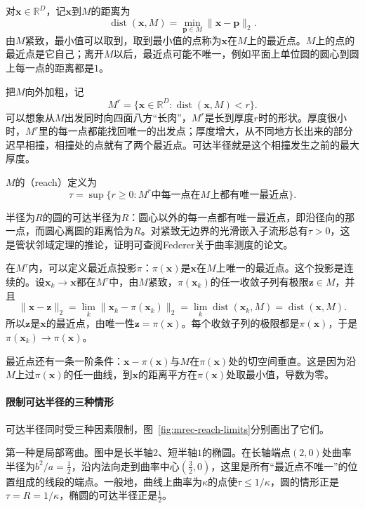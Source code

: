 对$\bm x\in\mathbb R^D$，记$\bm x$到$M$的距离为
\[
 \operatorname{dist}(\bm x,M)=\min_{\bm p\in M}\lVert\bm x-\bm p\rVert_2 .
\]
由$M$紧致，最小值可以取到，取到最小值的点称为$\bm x$在$M$上的最近点。$M$上的点的最近点是它自己；离开$M$以后，最近点可能不唯一，例如平面上单位圆的圆心到圆上每一点的距离都是$1$。

把$M$向外加粗，记
\[
 M^r=\{\bm x\in\mathbb R^D:\operatorname{dist}(\bm x,M)<r\}.
\]
可以想象从$M$出发同时向四面八方“长肉”，$M^r$是长到厚度$r$时的形状。厚度很小时，$M^r$里的每一点都能找回唯一的出发点；厚度增大，从不同地方长出来的部分迟早相撞，相撞处的点就有了两个最近点。可达半径就是这个相撞发生之前的最大厚度。

\begin{definition}[可达半径]
\label{def:mrec-reach}
$M$的（reach）定义为
\begin{equation}
 \tau=\sup\{r\geq0:M^r\text{中每一点在}M\text{上都有唯一最近点}\}.
 \label{eq:mrec-reach}
\end{equation}
\end{definition}

半径为$R$的圆的可达半径为$R$：圆心以外的每一点都有唯一最近点，即沿径向的那一点，而圆心离圆的距离恰为$R$。对紧致无边界的光滑嵌入子流形总有$\tau>0$，这是管状邻域定理的推论，证明可查阅Federer关于曲率测度的论文。

在$M^\tau$内，可以定义最近点投影$\pi$：$\pi(\bm x)$是$\bm x$在$M$上唯一的最近点。这个投影是连续的。设$\bm x_k\to\bm x$都在$M^\tau$中，由$M$紧致，$\pi(\bm x_k)$的任一收敛子列有极限$\bm z\in M$，并且
\[
 \lVert\bm x-\bm z\rVert_2=\lim_k\lVert\bm x_k-\pi(\bm x_k)\rVert_2=\lim_k\operatorname{dist}(\bm x_k,M)=\operatorname{dist}(\bm x,M).
\]
所以$\bm z$是$\bm x$的最近点，由唯一性$\bm z=\pi(\bm x)$。每个收敛子列的极限都是$\pi(\bm x)$，于是$\pi(\bm x_k)\to\pi(\bm x)$。

最近点还有一条一阶条件：$\bm x-\pi(\bm x)$与$M$在$\pi(\bm x)$处的切空间垂直。这是因为沿$M$上过$\pi(\bm x)$的任一曲线，到$\bm x$的距离平方在$\pi(\bm x)$处取最小值，导数为零。

\paragraph{限制可达半径的三种情形}

可达半径同时受三种因素限制，图~\ref{fig:mrec-reach-limits}分别画出了它们。

第一种是局部弯曲。图中是长半轴$2$、短半轴$1$的椭圆。在长轴端点$(2,0)$处曲率半径为$b^2/a=\tfrac12$，沿内法向走到曲率中心$(\tfrac32,0)$，这里是所有“最近点不唯一”的位置组成的线段的端点。一般地，曲线上曲率为$\kappa$的点使$\tau\leq1/\kappa$，圆的情形正是$\tau=R=1/\kappa$，椭圆的可达半径正是$\tfrac12$。

